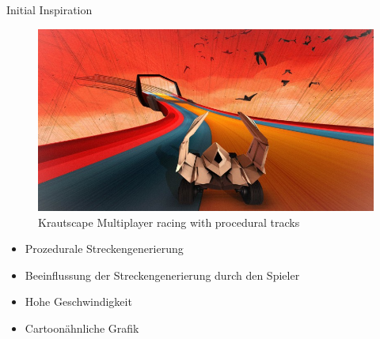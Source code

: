 \slideonetoone
{Initial Inspiration}
{
	\begin{figure}
		\centering
		\includegraphics[width=\textwidth, height=0.7\textheight, keepaspectratio]{images/krautscape_ks1}
		\caption{Krautscape \linebreak Multiplayer racing with procedural tracks}
	\end{figure}
}
{
	\begin{itemize}
		\item Prozedurale Streckengenerierung
		\item Beeinflussung der Streckengenerierung durch den Spieler
		\item Hohe Geschwindigkeit
		\item Cartoonähnliche Grafik
	\end{itemize}
}

